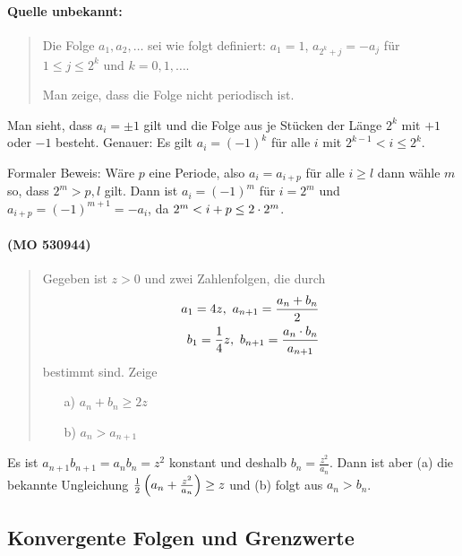 \documentclass[11pt,a4paper]{article}
\begin{document}
\paragraph{Quelle unbekannt:}
\begin{quote}
  Die Folge $a_1,a_2,\dots$ sei wie folgt definiert: $a_1=1$, $a_{2^k+j}=-a_j$
  für $1\le j\le 2^k$ und $k=0,1,\dots$.

  Man zeige, dass die Folge nicht periodisch ist.
\end{quote}
\begin{loesung}
  Man sieht, dass $a_i=\pm 1$ gilt und die Folge aus je Stücken der Länge
  $2^k$ mit $+1$ oder $-1$ besteht.  Genauer: Es gilt $a_i=(-1)^k$ für alle
  $i$ mit $2^{k-1}<i\le 2^k$. 

  Formaler Beweis: Wäre $p$ eine Periode, also $a_i=a_{i+p}$ für alle $i\ge l$
  dann wähle $m$ so, dass $2^m> p,l$ gilt. Dann ist $a_i=(-1)^m$ für $i=2^m$
  und $a_{i+p}=(-1)^{m+1}=-a_i$, da $2^m<i+p\le 2\cdot 2^m$. 
\end{loesung}

\paragraph{(MO 530944)}
\begin{quote}
  Gegeben ist $z>0$ und zwei Zahlenfolgen, die durch
  \begin{align*}
    a_1=4z,\ a_{n+1}=\frac{a_n+b_n}{2}\\
    b_1=\frac14z,\ b_{n+1}=\frac{a_n\cdot b_n}{a_{n+1}}
  \end{align*}
  bestimmt sind. Zeige
  \begin{itemize}
  \item [a)] $a_n+b_n\ge 2z$
  \item [b)] $a_n>a_{n+1}$
  \end{itemize}
\end{quote}
\begin{loesung}
  Es ist $a_{n+1}b_{n+1}=a_nb_n=z^2$ konstant und deshalb
  $b_n=\frac{z^2}{a_n}$.  Dann ist aber (a) die bekannte Ungleichung
  $\frac12\left(a_n+\frac{z^2}{a_n}\right)\ge z$ und (b) folgt aus $a_n>b_n$. 
\end{loesung}

\subsection*{Konvergente Folgen und Grenzwerte}
\end{document}
